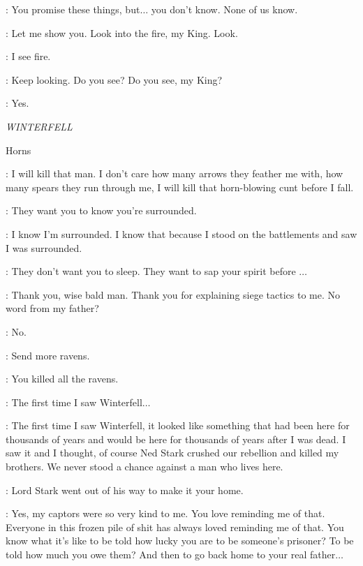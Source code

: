 \STANNIS: You promise these things, but$\ldots$ you don't know. None of us know. 

\MELISANDRE: Let me show you.  Look into the fire, my King. Look. 

\STANNIS: I see fire. 

\MELISANDRE: Keep looking. Do you see? Do you see, my King? 


\STANNIS: Yes. 


\scene

\textit{WINTERFELL} 

\sfx Horns


\THEON: I will kill that man. I don't care how many arrows they feather me with, how many spears they run through me, I will kill that horn-blowing cunt before I fall. 

\LUWIN: They want you to know you're surrounded. 

\THEON: I know I'm surrounded. I know that because I stood on the battlements and saw I was surrounded. 

\LUWIN: They don't want you to sleep. They want to sap your spirit before $\ldots$  

\THEON: Thank you, wise bald man. Thank you for explaining siege tactics to me. No word from my father? 

\LUWIN: No. 

\THEON: Send more ravens. 

\LUWIN: You killed all the ravens. 

\THEON: The first time I saw Winterfell$\ldots$ 


\THEON: The first time I saw Winterfell, it looked like something that had been here for thousands of years and would be here for thousands of years after I was dead. I saw it and I thought, of course Ned Stark crushed our rebellion and killed my brothers. We never stood a chance against a man who lives here. 

\LUWIN: Lord Stark went out of his way to make it your home. 

\THEON: Yes, my captors were so very kind to me. You love reminding me of that. Everyone in this frozen pile of shit has always loved reminding me of that. You know what it's like to be told how lucky you are to be someone's prisoner? To be told how much you owe them? And then to go back home to your real father$\ldots$ 

